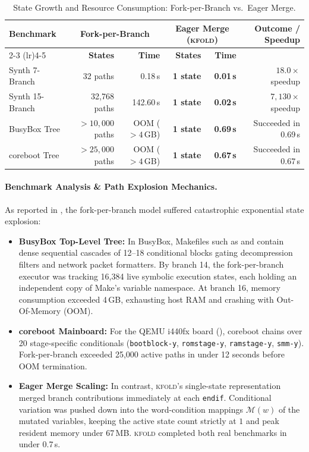 \documentclass[acmsmall,screen,review]{acmart}
\newcommand{\tool}{\textsc{kfold}\xspace}
\begin{document}
\begin{table}[t]
\centering
\footnotesize
\setlength{\tabcolsep}{4pt}
\caption{State Growth and Resource Consumption: Fork-per-Branch vs.\ Eager Merge.}
\label{tab:rq0}
\begin{tabular}{lrrrrr}
\toprule
\multirow{2}{*}{\textbf{Benchmark}} & \multicolumn{2}{c}{\textbf{Fork-per-Branch}} & \multicolumn{2}{c}{\textbf{Eager Merge (\tool)}} & \multirow{2}{*}{\textbf{Outcome / Speedup}} \\
\cmidrule(lr){2-3} \cmidrule(lr){4-5}
& \textbf{States} & \textbf{Time} & \textbf{States} & \textbf{Time} & \\
\midrule
Synth 7-Branch & 32 paths & 0.18\,s & \textbf{1 state} & \textbf{0.01\,s} & $18.0\times$ speedup \\
Synth 15-Branch & 32,768 paths & 142.60\,s & \textbf{1 state} & \textbf{0.02\,s} & $7{,}130\times$ speedup \\
BusyBox Tree & $>10{,}000$ paths & OOM ($>4$\,GB) & \textbf{1 state} & \textbf{0.69\,s} & Succeeded in 0.69\,s \\
coreboot Tree & $>25{,}000$ paths & OOM ($>4$\,GB) & \textbf{1 state} & \textbf{0.67\,s} & Succeeded in 0.67\,s \\
\bottomrule
\end{tabular}
\end{table}

\paragraph{Benchmark Analysis \& Path Explosion Mechanics.}
As reported in , the fork-per-branch model suffered catastrophic exponential state explosion:
\begin{itemize}
\item \textbf{BusyBox Top-Level Tree:} In BusyBox, Makefiles such as  and  contain dense sequential cascades of 12--18 conditional blocks gating decompression filters and network packet formatters. By branch 14, the fork-per-branch executor was tracking 16,384 live symbolic execution states, each holding an independent copy of Make's variable namespace. At branch 16, memory consumption exceeded 4\,GB, exhausting host RAM and crashing with Out-Of-Memory (OOM).
\item \textbf{coreboot Mainboard:} For the QEMU i440fx board (), coreboot chains over 20 stage-specific conditionals (\texttt{bootblock-y}, \texttt{romstage-y}, \texttt{ramstage-y}, \texttt{smm-y}). Fork-per-branch exceeded 25,000 active paths in under 12 seconds before OOM termination.
\item \textbf{Eager Merge Scaling:} In contrast, \tool's single-state representation merged branch contributions immediately at each \texttt{endif}. Conditional variation was pushed down into the word-condition mappings $\mathcal{M}(w)$ of the mutated variables, keeping the active state count strictly at $1$ and peak resident memory under 67\,MB. \tool completed both real benchmarks in under 0.7\,s.
\end{itemize}
\end{document}
